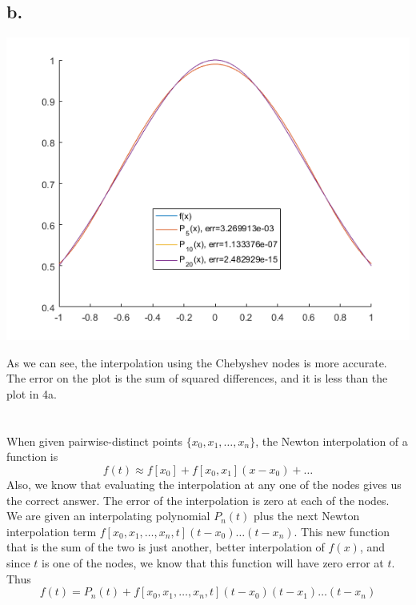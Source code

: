 \documentclass{article}
\begin{document}
\subsection*{b.}
\begin{center}
    \includegraphics[width=0.7\linewidth]{figures/question4b.png}
\end{center}
As we can see, the interpolation using the Chebyshev nodes is more accurate. 
The error on the plot is the sum of squared differences, and it is less than
the plot in 4a.

\section{}
When given pairwise-distinct points \(\{x_0,x_1,\dots,x_n\}\), the
Newton interpolation of a function is
\[f(t) \approx f[x_0] + f[x_0,x_1](x-x_0) + \dots\]
Also, we know that evaluating the interpolation at any one of the
nodes gives us the correct answer. The error of the interpolation is
zero at each of the nodes.\\
We are given an interpolating polynomial \(P_n(t)\) plus the next
Newton interpolation term
\(f[x_0,x_1,\dots,x_n,t](t-x_0)\dots(t-x_n)\). This new function that
is the sum of the two is just another, better interpolation of
\(f(x)\), and since \(t\) is one of the nodes, we know that this
function will have zero error at \(t\). Thus
\[f(t)=P_n(t)+f[x_0,x_1,\dots,x_n,t](t-x_0)(t-x_1)\dots(t-x_n)\]
\end{document}

